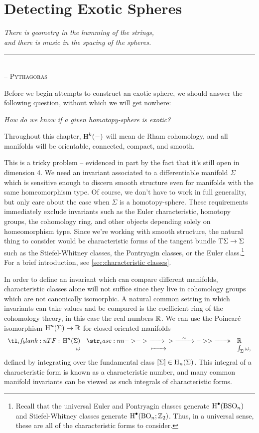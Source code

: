\chapter{Detecting Exotic Spheres}

\begin{flushleft}
	\textsl{There is geometry in the humming of the strings,}\\
	\textsl{and there is music in the spacing of the spheres.}\\
	\rule[0pt]{21em}{0.5pt}\\
	-- \textsc{Pythagoras}\\
	\vspace{2em}
\end{flushleft}

Before we begin attempts to construct an exotic sphere, we should answer the following question, without which we will get nowhere:
\begin{center}
	\textsl{How do we know if a given homotopy-sphere is exotic?}
\end{center}

\begin{convention*}
	Throughout this chapter, $\operatorname{H}^k(-)$ will mean de Rham cohomology, and all manifolds will be orientable, connected, compact, and smooth.
\end{convention*}

This is a tricky problem -- evidenced in part by the fact that it's still open in dimension 4. We need an invariant associated to a differentiable manifold $\Sigma$ which is sensitive enough to discern smooth structure even for manifolds with the same homeomorphism type. Of course, we don't have to work in full generality, but only care about the case when $\Sigma$ is a homotopy-sphere. These requirements immediately exclude invariants such as the Euler characteristic, homotopy groups, the cohomology ring, and other objects depending solely on homeomorphism type. Since we're working with smooth structure, the natural thing to consider would be characteristic forms of the tangent bundle $\mathrm{T} \Sigma \to \Sigma$ such as the Stiefel-Whitney classes, the Pontryagin classes, or the Euler class.\footnote{Recall that the universal Euler and Pontryagin classes generate $\operatorname{H}^\bullet({\operatorname{BSO}}_n)$ and Stiefel-Whitney classes generate $\operatorname{H}^\bullet({\operatorname{BO}}_n; \mathbb{Z}_2)$. Thus, in a universal sense, these are all of the characteristic forms to consider.} For a brief introduction, see \cref{sec:characteristic classes}.

In order to define an invariant which can compare different manifolds, characteristic classes alone will not suffice since they live in cohomology groups which are not canonically isomorphic. A natural common setting in which invariants can take values and be compared is the coefficient ring of the cohomology theory, in this case the real numbers $\mathbb{R}$.
We can use the Poincar\'e isomorphism $\operatorname{H}^n(\Sigma) \to \mathbb{R}$ for closed oriented manifolds
\[
	\lkxfunc{}{\H^n(\Sigma)}{\R}{\omega}{\int_\Sigma \omega,}
\]
defined by integrating over the fundamental class $[\Sigma]\in \operatorname{H}_n(\Sigma)$. This integral of a characteristic form is known as a characteristic number, and many common manifold invariants can be viewed as such integrals of characteristic forms.

